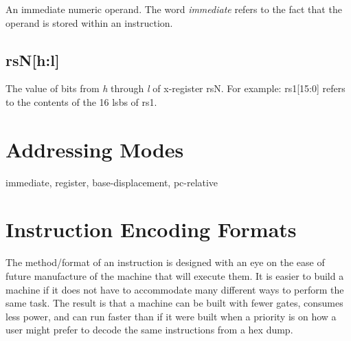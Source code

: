 An immediate numeric operand.  The word {\em immediate} refers
to the fact that the operand is stored within an instruction.

\subsection{rsN[h:l]}

The value of bits from {\em h} through {\em l} of x-register rsN.
For example: rs1[15:0] refers to the contents of 
the 16 \acrshort{lsb}s of rs1.


\section{Addressing Modes}

immediate, register, base-displacement, pc-relative


\section{Instruction Encoding Formats}
\label{section:EncodingFormats}



The method/format of an instruction is designed with an eye on the ease
of future manufacture of the machine that will execute them.  It is 
easier to build a machine if it does not have to accommodate many different 
ways to perform the same task.  The result is that a machine can be 
built with fewer gates, consumes less power, and can run faster than
if it were built when a priority is on how a user might prefer to decode
the same instructions from a hex dump.

